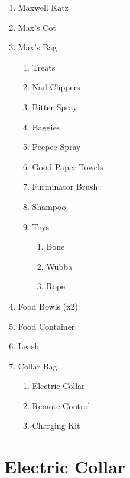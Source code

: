 \documentclass[pdftex,12pt]{article}
\begin{document}
\begin{enumerate}\label{itm:included_items}
    \item Maxwell Katz
    \item Max's Cot
    \item Max's Bag
        \begin{enumerate}
            \item Treats
            \item Nail Clippers
            \item Bitter Spray
            \item Baggies
            \item Peepee Spray
            \item Good Paper Towels
            \item Furminator Brush
            \item Shampoo
            \item Toys
                \begin{enumerate}
                    \item Bone
                    \item Wubba
                    \item Rope
                \end{enumerate}
        \end{enumerate}
    \item Food Bowls (x2)
    \item Food Container
    \item Leash
    \item Collar Bag
        \begin{enumerate}
            \item Electric Collar
            \item Remote Control
            \item Charging Kit
        \end{enumerate}
\end{enumerate}

\newpage
\section{Electric Collar}\label{sec:collar}
\end{document}
